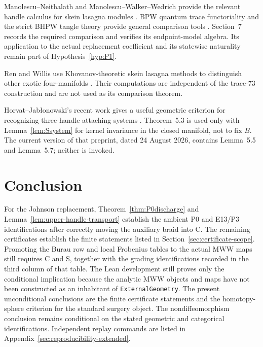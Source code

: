\documentclass[11pt]{amsart}
\theoremstyle{definition}
\theoremstyle{remark}
\begin{document}
Manolescu--Neithalath and Manolescu--Walker--Wedrich provide the relevant
handle calculus for skein lasagna modules
\cite{ManolescuNeithalath2020,ManolescuWalkerWedrich2023}.  BPW quantum trace
functoriality and the strict BHPW tangle theory provide general comparison
tools \cite{BeliakovaPutyraWehrli2019,
BeliakovaHogancampPutyraWehrli2023}.  Section~7 records the required
comparison and verifies its endpoint-model algebra.  Its application to the
actual replacement coefficient and its statewise naturality remain part of
Hypothesis~\ref{hyp:P1}.

Ren and Willis use Khovanov-theoretic skein lasagna methods to distinguish
other exotic four-manifolds \cite{RenWillis2024}.  Their computations are
independent of the trace-73 construction and are not used as its comparison
theorem.

Horvat--Jab\l{}onowski's recent work gives a useful geometric criterion for
recognizing three-handle attaching systems \cite{HorvatJablonowski2025}.
Theorem~5.3 is used only with Lemma~\ref{lem:Ssystem} for kernel invariance
in the closed manifold, not to fix $B$.  The current version of that preprint,
dated 24 August 2026, contains Lemma~5.5 and Lemma~5.7; neither is invoked.

\section{Conclusion}

For the Johnson replacement, Theorem~\ref{thm:P0discharge} and
Lemma~\ref{lem:upper-handle-transport} establish the ambient P0 and E13/P3
identifications after correctly moving the auxiliary braid into C.  The
remaining certificates establish the finite statements listed in
Section~\ref{sec:certificate-scope}.  Promoting the Burau row and local
Frobenius tables to the actual MWW maps still requires C and S, together with
the grading identifications recorded in the third column of that table.
The Lean development still proves only the conditional implication because
the analytic MWW objects and maps have not been constructed as an inhabitant
of \texttt{ExternalGeometry}.  The present unconditional conclusions are the
finite certificate statements and the homotopy-sphere criterion for the
standard surgery object.  The nondiffeomorphism conclusion remains conditional
on the stated geometric and categorical identifications.
Independent replay commands are listed in
Appendix~\ref{sec:reproducibility-extended}.

\appendix
\end{document}
